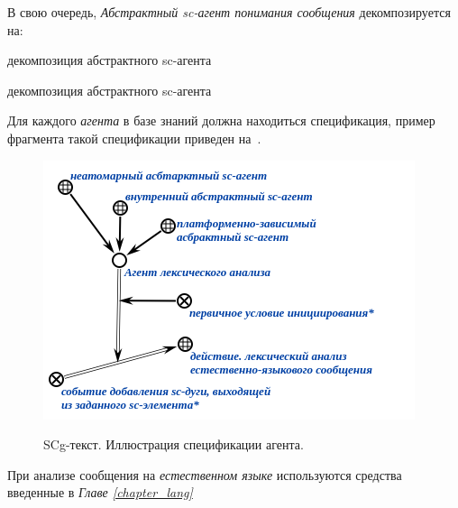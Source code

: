 В свою очередь, \textit{Абстрактный sc-агент понимания сообщения} декомпозируется на:

\begin{SCn}

    \begin{scnrelfromset}{декомпозиция абстрактного sc-агента}
        \begin{scnindent}
            \begin{scnrelfromset}{декомпозиция абстрактного sc-агента}
            \end{scnrelfromset}
        \end{scnindent}
    \end{scnrelfromset}

\end{SCn}

Для каждого \textit{агента} в базе знаний должна находиться спецификация, пример фрагмента такой спецификации приведен на~\textit{}.

\begin{figure}[H]
    \caption{SCg-текст. Иллюстрация спецификации агента.}
    \includegraphics[scale=0.8]{images/part4/chapter_nl_interfaces/agent_spec}
    \label{fig:agent_spec}
\end{figure}

При анализе сообщения на \textit{естественном языке} используются средства введенные в \textit{Главе \ref{chapter_lang}~}

